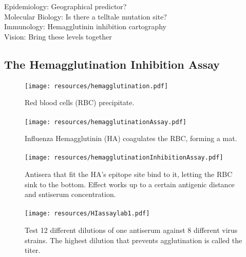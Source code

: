 \documentclass{beamer}
\begin{document}
\begin{darkframes}
\begin{frame}{\secname}

      \vfill
      Epidemiology: Geographical predictor?\\[2mm]

      Molecular Biology: Is there a telltale mutation site?\\[2mm]

      Immunology: Hemagglutinin inhibition cartography\\[2mm]

      \Large Vision: Bring these levels together
    \end{frame}




    \subsection{The Hemagglutination Inhibition Assay}

    \begin{frame}{\subsecname}
      \framesubtitle{}
      \begin{figure}
        \texttt{[image: resources/hemagglutination.pdf]}
        \caption{Red blood cells (RBC) precipitate.}
        \label{1}
      \end{figure}
    \end{frame}

    \begin{frame}{\subsecname}
      \framesubtitle{}
      \begin{figure}
        \texttt{[image: resources/hemagglutinationAssay.pdf]}
        \caption{Influenza Hemagglutinin (HA) coagulates the RBC, forming a mat.}
      \end{figure}
    \end{frame}

    \begin{frame}{\subsecname}
      \framesubtitle{}
      \begin{figure}
        \texttt{[image: resources/hemagglutinationInhibitionAssay.pdf]}
        \caption{Antisera that fit the HA's epitope site bind to it, letting the RBC sink to the bottom. Effect works up to a certain antigenic distance and sntiserum concentration.}
      \end{figure}
    \end{frame}

    \begin{frame}{\subsecname}
      \framesubtitle{}
      \begin{figure}
        \texttt{[image: resources/HIassaylab1.pdf]}
        \caption{\footnotesize Test 12 different dilutions of one antiserum against 8 different virus strains. The highest dilution that prevents agglutination is called the titer.}
      \end{figure}
    \end{frame}


\end{darkframes}
\end{document}
